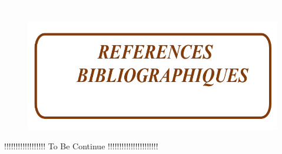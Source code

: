 \pagebreak

\section*{}

\begin{itemize}
  \item[\textcolor{white}{$\Box$}] 
\end{itemize}


\vspace{7cm}

\begin{figure}[H]
  \includegraphics{Images/bibliograph.png}
\end{figure}


\pagebreak
\renewcommand{\refname}{} %


\vspace{8cm}

!!!!!!!!!!!!!!!!!!      To Be Continue       !!!!!!!!!!!!!!!!!!!!!!
\pagebreak


